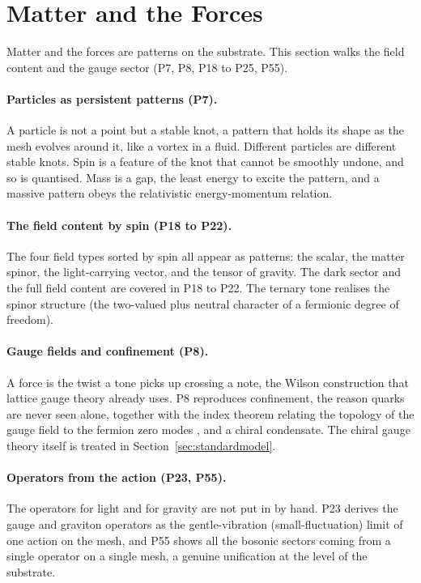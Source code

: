 \section{Matter and the Forces}
\label{sec:matter}

Matter and the forces are patterns on the substrate. This section walks the field content and the
gauge sector (P7, P8, P18 to P25, P55).

\paragraph{Particles as persistent patterns (P7).}
A particle is not a point but a stable knot, a pattern that holds its shape as the mesh evolves
around it, like a vortex in a fluid. Different particles are different stable knots. Spin is a
feature of the knot that cannot be smoothly undone, and so is quantised. Mass is a gap, the least
energy to excite the pattern, and a massive pattern obeys the relativistic energy-momentum relation.

\paragraph{The field content by spin (P18 to P22).}
The four field types sorted by spin all appear as patterns: the scalar, the matter spinor, the
light-carrying vector, and the tensor of gravity. The dark sector and the full field content are
covered in P18 to P22. The ternary tone realises the spinor structure (the two-valued plus neutral
character of a fermionic degree of freedom).

\paragraph{Gauge fields and confinement (P8).}
A force is the twist a tone picks up crossing a note, the Wilson construction \citep{wilson1974confinement} that
lattice gauge theory already uses. P8 reproduces confinement, the reason quarks are never seen
alone, together with the index theorem relating the topology of the gauge field to the fermion zero
modes \citep{neuberger1998exactly}, and a chiral condensate. The chiral gauge theory itself is treated in
Section~\ref{sec:standardmodel}.

\paragraph{Operators from the action (P23, P55).}
The operators for light and for gravity are not put in by hand. P23 derives the gauge and graviton
operators as the gentle-vibration (small-fluctuation) limit of one action on the mesh, and P55
shows all the bosonic sectors coming from a single operator on a single mesh, a genuine unification
at the level of the substrate.

